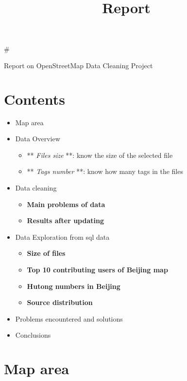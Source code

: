 \documentclass[11pt]{article}
\title{Report}
\providecommand{\tightlist}{%
      \setlength{\itemsep}{0pt}\setlength{\parskip}{0pt}}
\begin{document}
    
    
    \maketitle
    
    

    
    \#

Report on OpenStreetMap Data Cleaning Project

\section{Contents}\label{contents}

\begin{itemize}
\tightlist
\item
  Map area
\item
  Data Overview

  \begin{itemize}
  \tightlist
  \item
    ** \emph{Files size} **: know the size of the selected file
  \item
    ** \emph{Tags number} **: know how many tags in the files
  \end{itemize}
\item
  Data cleaning

  \begin{itemize}
  \tightlist
  \item
    \textbf{Main problems of data}
  \item
    \textbf{Results after updating}
  \end{itemize}
\item
  Data Exploration from sql data

  \begin{itemize}
  \tightlist
  \item
    \textbf{Size of files}
  \item
    \textbf{Top 10 contributing users of Beijing map}
  \item
    \textbf{Hutong numbers in Beijing}
  \item
    \textbf{Source distribution}
  \end{itemize}
\item
  Problems encountered and solutions
\item
  Conclusions
\end{itemize}

    \section{Map area}\label{map-area}
\end{document}
